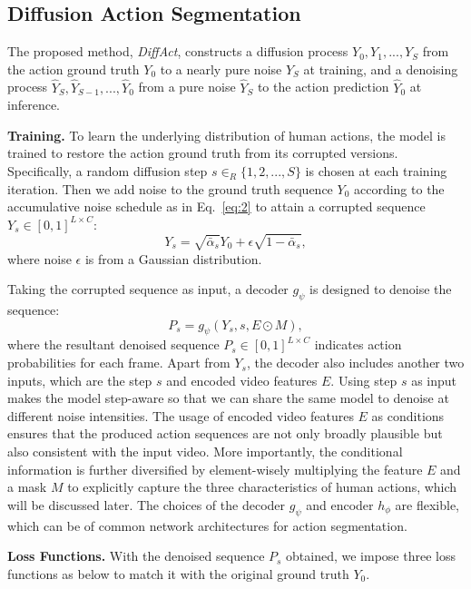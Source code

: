 \documentclass[10pt,twocolumn,letterpaper]{article}
\begin{document}
\subsection{Diffusion Action Segmentation}

The proposed method, \textit{DiffAct}, constructs a diffusion process $Y_0, Y_1, ..., Y_S$ from the action ground truth $Y_0$ to a nearly pure noise $Y_S$ at training, and a denoising process $\hat{Y}_S, \hat{Y}_{S-1}, ..., \hat{Y}_0$ from a pure noise $\hat{Y}_S$ to the action prediction $\hat{Y}_0$ at inference. 

\textbf{Training.}
To learn the underlying distribution of human actions, the model is trained to restore the action ground truth from its corrupted versions.
Specifically, a random diffusion step $s \in_R \{1, 2, ..., S\}$ is chosen at each training iteration.
Then we add noise to the ground truth sequence $Y_0$ according to the accumulative noise schedule as in Eq.~\ref{eq:2} to attain a corrupted sequence $Y_s \in [0,1]^{L \times C}$:
\begin{equation}  \label{eq:6}
Y_s = \sqrt{\bar{\alpha}_s}Y_{0} + \epsilon \sqrt{1-\bar{\alpha}_s},
\end{equation}
where noise $\epsilon$ is from a Gaussian distribution.

Taking the corrupted sequence as input, a decoder $g_\psi$ is designed to denoise the sequence:
\begin{equation}  \label{eq:7}
P_s = g_\psi(Y_s,s,E \odot M),
\end{equation}
where the resultant denoised sequence $P_s \in [0,1]^{L \times C}$ indicates action probabilities for each frame. 
Apart from $Y_s$, the decoder also includes another two inputs, which are the step $s$ and encoded video features $E$.
Using step $s$ as input makes the model step-aware so that we can share the same model to denoise at different noise intensities.
The usage of encoded video features $E$ as conditions ensures that the produced action sequences are not only broadly plausible but also consistent with the input video.
More importantly, the conditional information is further diversified by element-wisely multiplying the feature $E$ and a mask $M$ to explicitly capture the three characteristics of human actions, which will be discussed later. 
The choices of the decoder $g_\psi$ and encoder $h_\phi$ are flexible, which can be of common network architectures for action segmentation.




\textbf{Loss Functions.}
With the denoised sequence $P_s$ obtained, we impose three loss functions as below to match it with the original ground truth $Y_0$.
\end{document}
